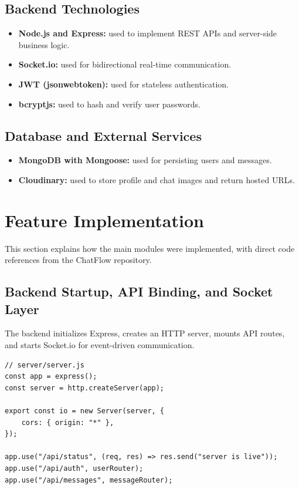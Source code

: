 \documentclass[12pt,a4paper]{report}
\begin{document}
\subsection{Backend Technologies}
\begin{itemize}
    \item \textbf{Node.js and Express:} used to implement REST APIs and server-side business logic.
    \item \textbf{Socket.io:} used for bidirectional real-time communication.
    \item \textbf{JWT (jsonwebtoken):} used for stateless authentication.
    \item \textbf{bcryptjs:} used to hash and verify user passwords.
\end{itemize}

\subsection{Database and External Services}
\begin{itemize}
    \item \textbf{MongoDB with Mongoose:} used for persisting users and messages.
    \item \textbf{Cloudinary:} used to store profile and chat images and return hosted URLs.
\end{itemize}

\section{Feature Implementation}
This section explains how the main modules were implemented, with direct code references from the ChatFlow repository.

\subsection{Backend Startup, API Binding, and Socket Layer}
The backend initializes Express, creates an HTTP server, mounts API routes, and starts Socket.io for event-driven communication.

\begin{verbatim}
// server/server.js
const app = express();
const server = http.createServer(app);

export const io = new Server(server, {
    cors: { origin: "*" },
});

app.use("/api/status", (req, res) => res.send("server is live"));
app.use("/api/auth", userRouter);
app.use("/api/messages", messageRouter);
\end{verbatim}
\end{document}
